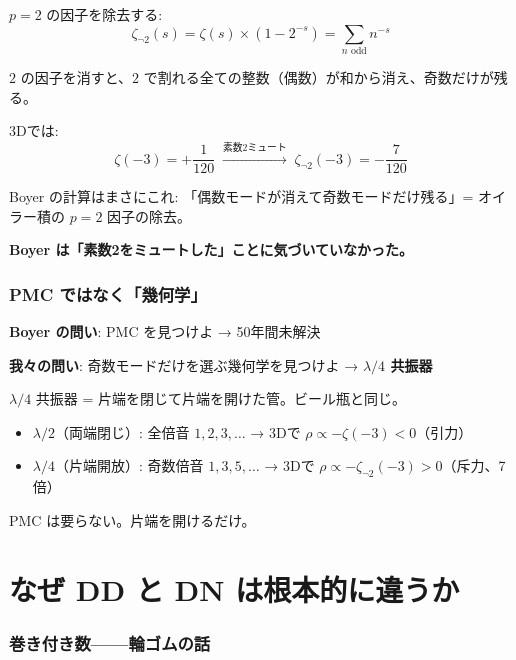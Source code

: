 \documentclass[12pt,a4paper]{article}
\begin{document}
\begin{mathbox}[素数ミュート]
$p=2$ の因子を除去する:
$$\zeta_{\neg 2}(s) = \zeta(s) \times (1 - 2^{-s}) = \sum_{n \text{ odd}} n^{-s}$$

$2$ の因子を消すと、$2$ で割れる全ての整数（偶数）が和から消え、奇数だけが残る。

3Dでは:
$$\zeta(-3) = +\frac{1}{120} \;\xrightarrow{\text{素数2ミュート}}\; \zeta_{\neg 2}(-3) = -\frac{7}{120}$$

Boyer の計算はまさにこれ: 「偶数モードが消えて奇数モードだけ残る」= オイラー積の $p=2$ 因子の除去。

\textbf{Boyer は「素数2をミュートした」ことに気づいていなかった。}
\end{mathbox}

\section{PMC ではなく「幾何学」}

\begin{resultbox}[問題の変換]
\textbf{Boyer の問い}: PMC を見つけよ → 50年間未解決

\textbf{我々の問い}: 奇数モードだけを選ぶ幾何学を見つけよ → \textbf{$\lambda/4$ 共振器}

$\lambda/4$ 共振器 = 片端を閉じて片端を開けた管。ビール瓶と同じ。
\begin{itemize}
\item $\lambda/2$（両端閉じ）: 全倍音 $1, 2, 3, \ldots$ → 3Dで $\rho \propto -\zeta(-3) < 0$（引力）
\item $\lambda/4$（片端開放）: 奇数倍音 $1, 3, 5, \ldots$ → 3Dで $\rho \propto -\zeta_{\neg 2}(-3) > 0$（斥力、7倍）
\end{itemize}

PMC は要らない。片端を開けるだけ。
\end{resultbox}

\part{なぜ DD と DN は根本的に違うか}

\section{巻き付き数——輪ゴムの話}
\end{document}
